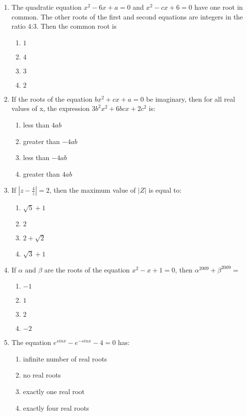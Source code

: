 \documentclass[journal,12pt,twocolumn]{IEEEtran}
\begin{document}
\begin{enumerate}[label=\arabic*]
\item The quadratic equation $x^2-6x+a=0$ and $x^2-cx+6=0$ have one root in common. The other roots of the first and second equations are integers in the ratio 4:3. Then the common root is
\begin{enumerate}
\item $1$
\item $4$
\item $3$
\item $2$ 
\end{enumerate}

\item If the roots of the equation $bx^2+cx+a=0$ be imaginary, then for all real values of x, the expression $3b^2x^2+6bcx+2c^2$ is:
\begin{enumerate}
\item less than $4ab$
\item greater than $-4ab$
\item less than $-4ab$
\item greater than $4ab$
\end{enumerate}

\item If $|z-\frac{4}{z}|=2$, then the maximum value of $|Z|$ is equal to: 
\begin{enumerate}
\item $\sqrt{5}+1$
\item $2$
\item $2+\sqrt{2}$
\item $\sqrt{3}+1$ 
\end{enumerate}

\item If $\alpha$ and $\beta$ are the roots of the equation $x^2-x+1=0$, then $\alpha^{2009}+\beta^{2009}=$
\begin{enumerate}
\item $-1$
\item $1$
\item $2$
\item $-2$ 
\end{enumerate}

\item The equation $e^{sinx}-e^{-sinx}-4=0$ has:
\begin{enumerate}
\item infinite number of real roots
\item no real roots
\item exactly one real root
\item exactly four real roots
\end{enumerate}


\end{enumerate}
\end{document}
